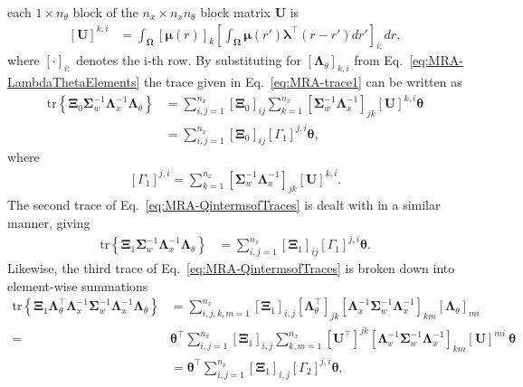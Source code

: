 \documentclass[review,authoryear,3p]{elsarticle}
\begin{document}
each $ 1 \times n_{\theta}$ block of the $n_x \times n_x n_{\theta}$ block matrix $\mathbf U$ is 
\begin{align}\label{eq:Uij}
\left[ \mathbf U\right] ^{k,i}&=\int_{\boldsymbol \Omega}\left[\boldsymbol\mu(r) \right]_k \left[\int_{\boldsymbol\Omega} \boldsymbol\mu\left(r'\right)\boldsymbol \lambda^\top \left(r-r'\right) dr'\right]_{i:} dr,
\end{align}
where $[\cdot]_{i:} $ denotes the i-th row.  By substituting for $\left[ \boldsymbol\Lambda_{\theta}\right] _{k,i}$ from Eq.~\eqref{eq:MRA-LambdaThetaElements} the trace given in Eq.~\eqref{eq:MRA-trace1} can be written as
\begin{align}
\mathrm{tr} \left\lbrace \boldsymbol \Xi_0\boldsymbol\Sigma_w^{-1}\boldsymbol\Lambda_x^{-1}\boldsymbol\Lambda_{\theta}\right\rbrace&=\sum_{i,j=1}^{n_x}\left[ \boldsymbol\Xi_0\right]_{ij}\sum_{k=1}^{n_x}\left[ \boldsymbol\Sigma_w^{-1}\boldsymbol\Lambda_x^{-1}\right]_{jk} \left[ \mathbf U\right]^{k,i}\boldsymbol\theta \nonumber \\
&=\sum_{i,j=1}^{n_x}\left[ \boldsymbol\Xi_0\right]_{ij}\left[ \Gamma_1\right] ^{j,i}\boldsymbol\theta,
\end{align}
where
\begin{align}
\left[ \Gamma_1\right]^{j,i} =\sum_{k=1}^{n_x}\left[ \boldsymbol\Sigma_w^{-1}\boldsymbol\Lambda_x^{-1}\right]_{jk} \left[ \mathbf U\right]^{k,i}.
\end{align}
The second trace of Eq.~\eqref{eq:MRA-QintermsofTraces} is dealt with in a similar manner, giving
\begin{align}
\mathrm{tr} \left\lbrace \boldsymbol \Xi_1\boldsymbol\Sigma_w^{-1}\boldsymbol\Lambda_x^{-1}\boldsymbol\Lambda_{\theta}\right\rbrace&=
\sum_{i,j=1}^{n_x}\left[ \boldsymbol\Xi_1\right]_{ij}\left[ \Gamma_1\right] ^{j,i}\boldsymbol\theta.
\end{align}
Likewise, the third trace of Eq.~\eqref{eq:MRA-QintermsofTraces} is broken down into element-wise summations
\begin{align}
\mathrm{tr} \left\lbrace \boldsymbol\Xi_1 \boldsymbol\Lambda_{\theta}^\top\boldsymbol\Lambda_x^{-1}\boldsymbol\Sigma_w^{-1}\boldsymbol\Lambda_x^{-1}\boldsymbol\Lambda_{\theta}\right\rbrace&=\sum_{i,j,k,m=1}^{n_x}\left[\boldsymbol\Xi_1\right] _{i,j}[\boldsymbol\Lambda_{\theta}^{\top}]_{jk} \left[\boldsymbol\Lambda_x^{-1}\boldsymbol\Sigma_w^{-1}\boldsymbol\Lambda_x^{-1} \right]_{km}[\boldsymbol\Lambda_{\theta}]_{mi} \nonumber \\
=&\boldsymbol\theta^\top\sum_{i,j=1}^{n_x}\left[\boldsymbol\Xi_1\right] _{i,j}\sum_{k,m=1}^{n_x}[\mathbf U^{\top}]^{jk} \left[\boldsymbol\Lambda_x^{-1}\boldsymbol\Sigma_w^{-1}\boldsymbol\Lambda_x^{-1} \right]_{km}[\mathbf U]^{mi}~\boldsymbol\theta \nonumber \\
&=\boldsymbol\theta^\top\sum_{i,j=1}^{n_x}\left[\boldsymbol\Xi_1\right] _{i,j}\left[ \Gamma_2\right] ^{j,i}\boldsymbol\theta,
\end{align}
\end{document}
